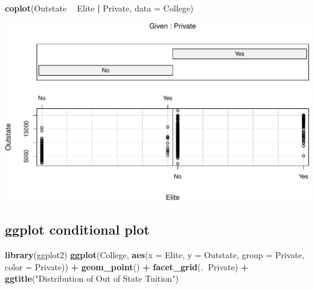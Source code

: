 \documentclass[]{article}
\newenvironment{Shaded}{\begin{snugshade}}{\end{snugshade}}
\newcommand{\KeywordTok}[1]{\textcolor[rgb]{0.13,0.29,0.53}{\textbf{#1}}}
\newcommand{\DataTypeTok}[1]{\textcolor[rgb]{0.13,0.29,0.53}{#1}}
\newcommand{\StringTok}[1]{\textcolor[rgb]{0.31,0.60,0.02}{#1}}
\newcommand{\OperatorTok}[1]{\textcolor[rgb]{0.81,0.36,0.00}{\textbf{#1}}}
\newcommand{\NormalTok}[1]{#1}
\begin{document}
\begin{Shaded}
\begin{Highlighting}[]
\KeywordTok{coplot}\NormalTok{(Outstate }\OperatorTok{~}\StringTok{ }\NormalTok{Elite }\OperatorTok{|}\StringTok{ }\NormalTok{Private, }\DataTypeTok{data =}\NormalTok{ College)}
\end{Highlighting}
\end{Shaded}

\includegraphics{Lab1Q_files/figure-latex/unnamed-chunk-11-1.pdf}

\subsection{ggplot conditional plot}\label{ggplot-conditional-plot}

\begin{Shaded}
\begin{Highlighting}[]
\KeywordTok{library}\NormalTok{(ggplot2)}
\KeywordTok{ggplot}\NormalTok{(College, }\KeywordTok{aes}\NormalTok{(}\DataTypeTok{x =}\NormalTok{ Elite, }\DataTypeTok{y =}\NormalTok{ Outstate, }
                    \DataTypeTok{group =}\NormalTok{ Private, }
                    \DataTypeTok{color =}\NormalTok{ Private)) }\OperatorTok{+}
\StringTok{   }\KeywordTok{geom_point}\NormalTok{() }\OperatorTok{+}\StringTok{ }\KeywordTok{facet_grid}\NormalTok{(.}\OperatorTok{~}\NormalTok{Private) }\OperatorTok{+}\StringTok{ }\KeywordTok{ggtitle}\NormalTok{(}\StringTok{"Distribution of Out of State Tuition"}\NormalTok{) }
\end{Highlighting}
\end{Shaded}
\end{document}

